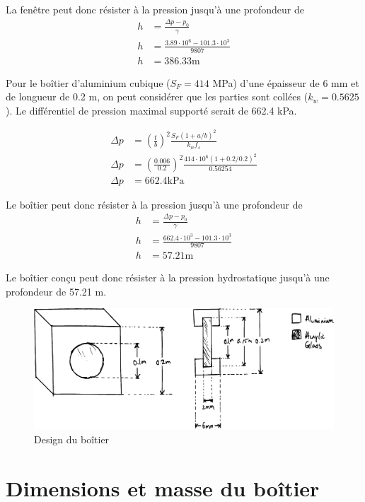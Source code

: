 La fenêtre peut donc résister à la pression  jusqu'à une profondeur de
\begin{align*}
    h &= \frac{\Delta p -p_0}{\gamma}\\
    h &= \frac{3.89\cdot10^6 - 101.3\cdot 10^3}{9807}\\
    h &= 386.33\text{m} 
\end{align*}

Pour le boîtier d'aluminium cubique ($S_F=414$ MPa) d'une épaisseur de 6 mm et de longueur de 0.2 m, on peut considérer que les parties sont collées ($k_w=0.5625$). Le différentiel de pression maximal supporté serait de 662.4 kPa.

\begin{align*}
    \Delta p &= \left( \frac{t}{b}\right)^2 \frac{S_F(1+a/b)^2}{k_w f_s}\\
    \Delta p &= \left( \frac{0.006}{0.2}\right)^2 \frac{414\cdot10^6(1+0.2/0.2)^2}{0.5625 4}\\
    \Delta p &= 662.4 \text{kPa}
\end{align*}

Le boîtier peut donc résister à la pression  jusqu'à une profondeur de
\begin{align*}
    h &= \frac{\Delta p -p_0}{\gamma}\\
    h &= \frac{662.4\cdot10^3 - 101.3\cdot 10^3}{9807}\\
    h &= 57.21\text{m} 
\end{align*}

Le boîtier conçu peut donc résister à la pression hydrostatique jusqu'à une profondeur de 57.21 m.

\begin{figure}[!htb]
    \centering
    \includegraphics[width=0.85\linewidth]{fig/camera_custom_boitier_vect.png}
    \caption{Design du boîtier}
    \label{fig:boitier_camera_custom}
\end{figure}

\section{Dimensions et masse du boîtier}

